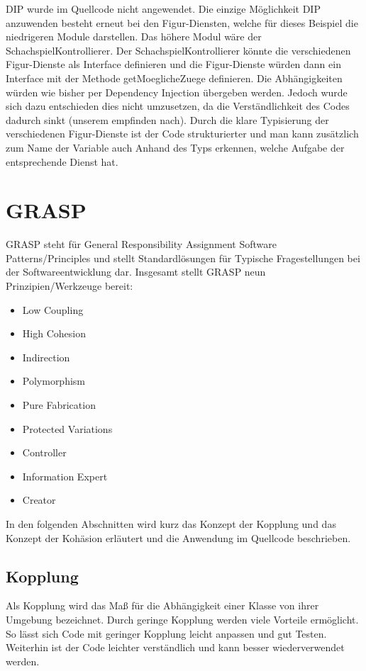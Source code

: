 DIP wurde im Quellcode nicht angewendet. Die einzige Möglichkeit DIP anzuwenden besteht erneut bei den Figur-Diensten, welche für dieses Beispiel die niedrigeren Module darstellen. Das höhere Modul wäre der SchachspielKontrollierer. Der SchachspielKontrollierer könnte die verschiedenen Figur-Dienste als Interface definieren und die Figur-Dienste würden dann ein Interface mit der Methode getMoeglicheZuege definieren. Die Abhängigkeiten würden wie bisher per Dependency Injection übergeben werden. Jedoch wurde sich dazu entschieden dies nicht umzusetzen, da die Verständlichkeit des Codes dadurch sinkt (unserem empfinden nach). Durch die klare Typisierung der verschiedenen Figur-Dienste ist der Code strukturierter und man kann zusätzlich zum Name der Variable auch Anhand des Typs erkennen, welche Aufgabe der entsprechende Dienst hat.

\section{GRASP}
GRASP steht für General Responsibility Assignment Software Patterns/Principles und stellt Standardlösungen für Typische Fragestellungen bei der Softwareentwicklung dar. Insgesamt stellt GRASP neun Prinzipien/Werkzeuge bereit:
\begin{itemize}
    \item Low Coupling
    \item High Cohesion
    \item Indirection
    \item Polymorphism
    \item Pure Fabrication
    \item Protected Variations
    \item Controller
    \item Information Expert
    \item Creator
\end{itemize}

In den folgenden Abschnitten wird kurz das Konzept der Kopplung und das Konzept der Kohäsion erläutert und die Anwendung im Quellcode beschrieben.

\subsection{Kopplung}
Als Kopplung wird das Maß für die Abhängigkeit einer Klasse von ihrer Umgebung bezeichnet. Durch geringe Kopplung werden viele Vorteile ermöglicht. So lässt sich Code mit geringer Kopplung leicht anpassen und gut Testen. Weiterhin ist der Code leichter verständlich und kann besser wiederverwendet werden.

